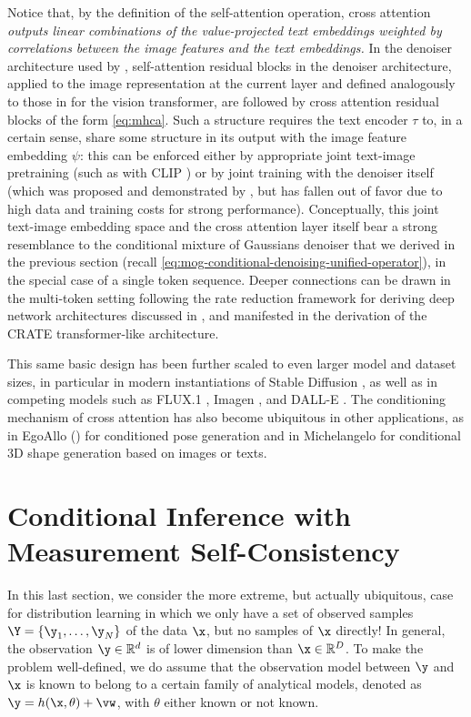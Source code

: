 \documentclass[../../book-main.tex]{subfiles}
\begin{document}
Notice that, by the definition of the self-attention operation, cross attention
\textit{outputs linear combinations of the value-projected text embeddings
weighted by correlations between the image features and the text embeddings.}
In the denoiser architecture used by \textcite{rombach2022high}, 
self-attention residual blocks in the denoiser architecture, applied to the
image representation at the current layer and defined analogously
to those in  for the vision transformer, are followed by cross
attention residual blocks of the form \eqref{eq:mhca}.
Such a structure requires the text encoder $\tau$ to, in a certain sense, share some
structure in its output with the image feature embedding $\psi$: this can be
enforced either by appropriate joint text-image pretraining (such as with CLIP
\cite{Radford2021-ir}) or by joint training with
the denoiser itself (which was proposed and demonstrated by
\textcite{rombach2022high}, but has fallen out of favor due to high data and
training costs for strong performance).
Conceptually, this joint text-image embedding space and the cross attention
layer itself bear a strong resemblance to the
conditional mixture of Gaussians denoiser that we derived in the previous
section (recall \eqref{eq:mog-conditional-denoising-unified-operator}), in the
special case of a single token sequence. Deeper
connections can be drawn in the multi-token setting following the rate reduction
framework for deriving deep network architectures discussed in
, and manifested in the derivation of the CRATE
transformer-like architecture.

This same basic design has been further scaled to even larger model and dataset
sizes, in particular in modern instantiations of Stable Diffusion
\cite{DBLP:conf/icml/EsserKBEMSLLSBP24}, as well as in competing models such as
FLUX.1 \cite{Labs2025-fb}, Imagen \cite{Saharia2022-na}, and DALL-E \cite{Ramesh2022-nu}. 
The conditioning mechanism of cross attention has also become ubiquitous in
other applications, as in EgoAllo () for conditioned pose generation and in Michelangelo \cite{zhao2023michelangelo} for conditional 3D shape generation based on images or texts. 






\section{Conditional Inference with Measurement Self-Consistency}
\label{sec:measurement-self-consistency}
In this last section, we consider the more extreme, but actually ubiquitous, case for distribution learning in which we only have a set of observed samples $\Y = \{\y_1,\ldots, \y_N\}$ of the data $\x$, but no samples of $\x$ directly! In general, the observation $\y \in \mathbb{R}^d$ is of lower dimension than $\x \in \mathbb{R}^D$. To make the problem well-defined, we do assume that the observation model between $\y$ and $\x$ is known to belong to a certain family of analytical models, denoted as $\y = h(\x, \theta) +\vw$, with $\theta$ either known or not known. 
\end{document}
